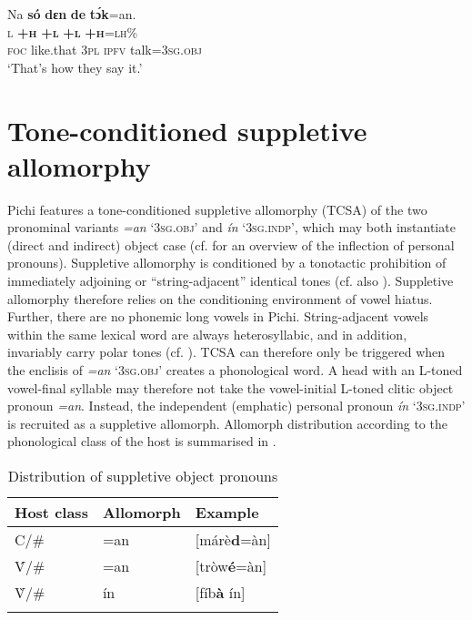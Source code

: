 \ea%
    \label{ex:key:65}
    \glll   Na  \textbf{só}    \textbf{dɛn}  \textbf{de}  \textbf{tɔ́k}=an.    \\
\textsc{l}  \textbf{\textsc{+h}}    \textbf{\textsc{+l}}  \textbf{\textsc{+l}}  \textbf{\textsc{+h}}\textsc{=lh\%}      \\
\textsc{foc}  like.that  \textsc{3pl}  \textsc{ipfv}  talk=\textsc{3sg.obj}\\
\glt ‘That’s how they say it.’
\z

\section{Tone-conditioned suppletive allomorphy}\label{sec:3.3}

Pichi features a tone-conditioned suppletive allomorphy (TCSA) of the two pronominal variants \textit{=an} \textsc{‘3sg.obj’} and \textit{ín} ‘\textsc{3sg.indp’}, which may both instantiate (direct and indirect) object case (cf.  for an overview of the inflection of personal pronouns). Suppletive allomorphy is conditioned by a tonotactic prohibition of immediately adjoining or “string-adjacent” \citep{Suzuki1998} identical tones (cf. also ). Suppletive allomorphy therefore relies on the conditioning environment of vowel hiatus. Further, there are no phonemic long vowels in Pichi. String-adjacent vowels within the same lexical word are always heterosyllabic, and in addition, invariably carry polar tones (cf. ). TCSA can therefore only be triggered when the enclisis of \textit{=an} \textsc{‘3sg.obj’} creates a phonological word. A head with an L-toned vowel-final syllable may therefore not take the vowel-initial L-toned clitic object pronoun \textit{=an}. Instead, the independent (emphatic) personal pronoun \textit{ín} \textsc{‘3sg.indp’} is recruited as a suppletive allomorph. Allomorph distribution according to the phonological class of the host is summarised in .

\begin{table}
\caption{Distribution of suppletive object pronouns}
\label{tab:key:3.4}

\begin{tabularx}{.8\textwidth}{XXl}
\lsptoprule
{Host class} & {Allomorph} & {Example}\\
\midrule
C/{\longrule}\# & =an & [márè\textbf{d}=àn]\\
\'{V}/{\longrule}\# & =an & [tròw\textbf{é}=àn]\\
\`{V}/{\longrule}\# & ín & [fíb\textbf{à} ín]\\
\lspbottomrule
\end{tabularx}
\end{table}


